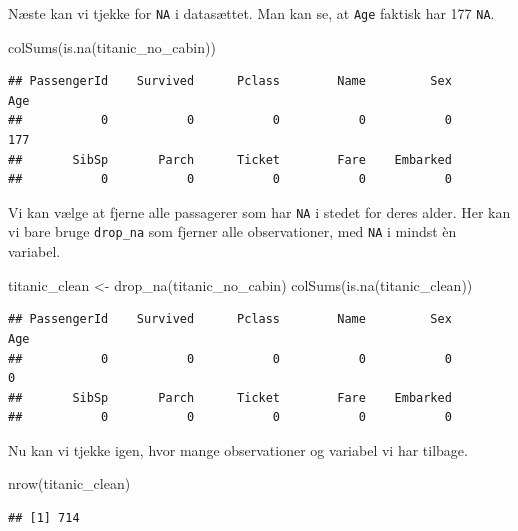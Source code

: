 \documentclass[
]{book}
\newenvironment{Shaded}{\begin{snugshade}}{\end{snugshade}}
\newcommand{\FunctionTok}[1]{\textcolor[rgb]{0.00,0.00,0.00}{#1}}
\newcommand{\NormalTok}[1]{#1}
\newcommand{\OtherTok}[1]{\textcolor[rgb]{0.56,0.35,0.01}{#1}}
\begin{document}
Næste kan vi tjekke for \texttt{NA} i datasættet. Man kan se, at \texttt{Age} faktisk har 177 \texttt{NA}.

\begin{Shaded}
\begin{Highlighting}[]
\FunctionTok{colSums}\NormalTok{(}\FunctionTok{is.na}\NormalTok{(titanic\_no\_cabin))}
\end{Highlighting}
\end{Shaded}

\begin{verbatim}
## PassengerId    Survived      Pclass        Name         Sex         Age 
##           0           0           0           0           0         177 
##       SibSp       Parch      Ticket        Fare    Embarked 
##           0           0           0           0           0
\end{verbatim}

Vi kan vælge at fjerne alle passagerer som har \texttt{NA} i stedet for deres alder. Her kan vi bare bruge \texttt{drop\_na} som fjerner alle observationer, med \texttt{NA} i mindst èn variabel.

\begin{Shaded}
\begin{Highlighting}[]
\NormalTok{titanic\_clean }\OtherTok{\textless{}{-}} \FunctionTok{drop\_na}\NormalTok{(titanic\_no\_cabin)}
\FunctionTok{colSums}\NormalTok{(}\FunctionTok{is.na}\NormalTok{(titanic\_clean))}
\end{Highlighting}
\end{Shaded}

\begin{verbatim}
## PassengerId    Survived      Pclass        Name         Sex         Age 
##           0           0           0           0           0           0 
##       SibSp       Parch      Ticket        Fare    Embarked 
##           0           0           0           0           0
\end{verbatim}

Nu kan vi tjekke igen, hvor mange observationer og variabel vi har tilbage.

\begin{Shaded}
\begin{Highlighting}[]
\FunctionTok{nrow}\NormalTok{(titanic\_clean)}
\end{Highlighting}
\end{Shaded}

\begin{verbatim}
## [1] 714
\end{verbatim}
\end{document}
